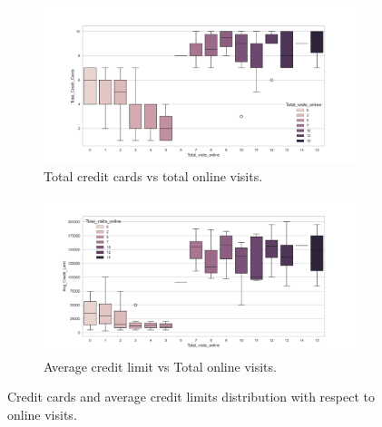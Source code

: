 \documentclass[10pt,a4paper]{style}
\begin{document}
		\begin{figure}[h]
			\centering
			\begin{subfigure}[t]{0.49\textwidth}
				\includegraphics[width=\textwidth]{bi_box_Total_visits_online_Total_Credit_Cards.png}
				\caption{Total credit cards vs total online visits.}
				\label{fig:bi_box_Total_visits_online_Total_Credit_Cards}
			\end{subfigure}
			\hfill
			\begin{subfigure}[t]{0.49\textwidth}
				\includegraphics[width=\textwidth]{bi_box_Total_visits_online_Avg_Credit_Limit.png}
				\caption{Average credit limit vs Total online visits.}
				\label{fig:bi_box_Total_visits_online_Avg_Credit_Limit}
			\end{subfigure}
			\caption{Credit cards and average credit limits distribution with respect to online visits.}
			\label{fig:Credit cards and average credit limits distribution with respect to online visits}
		\end{figure}	
		
\end{document}
